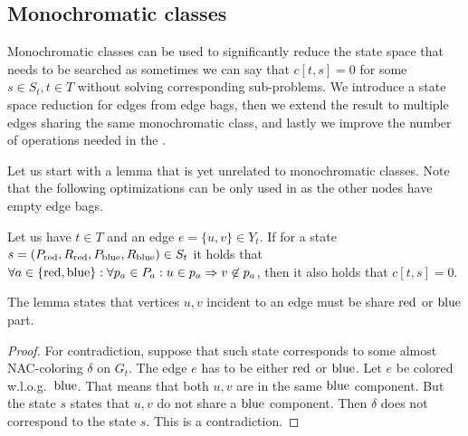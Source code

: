 \subsection{Monochromatic classes}

Monochromatic classes can be used to significantly reduce the state space
that needs to be searched as sometimes we can say that
\( c[t, s] = 0 \) for some \( s \in S_t, t \in T \)
without solving corresponding sub-problems.
%
We introduce a state space reduction for edges from edge bags,
then we extend the result to multiple edges
sharing the same monochromatic class,
and lastly we improve the number of
operations needed in the \IntroduceVertexWithEdgesNode{}.

Let us start with a lemma that is yet unrelated to monochromatic classes.
Note that the following optimizations can be only used in \IntroduceEdgeNode{}
as the other nodes have empty edge bags.
%
\begin{lemma}
	Let us have \( t \in T \) and an edge \( e = \{u, v\} \in Y_t \).
	If for a state \( s = (P_{\text{red}}, R_{\text{red}}, P_{\text{blue}}, R_{\text{blue}}) \in S_t \)
	it holds that
	\( {\forall a \in \{\text{red}, \text{blue}\}} : {\forall p_a \in P_a} : {u \in p_a \Rightarrow v \not\in p_a} \),
	then it also holds that \( c[t, s] = 0 \).
\end{lemma}
%
The lemma states that vertices \( u, v \) incident to an edge must
be share \( \text{red} \) or \( \text{blue} \) part.
%
\begin{proof}
	For contradiction, suppose that such state corresponds
	to some almost NAC-coloring \( \delta \) on \( G_t \).
	The edge \( e \) has to be either \( \text{red} \) or \( \text{blue} \).
	Let \( e \) be colored w.l.o.g.\ \( \text{blue} \).
	That means that both \( u, v \) are in the same \( \text{blue} \) component.
	But the state \( s \) states that \( u, v \) do not share a \( \text{blue} \) component.
	Then \( \delta \) does not correspond to the state \( s \).
	This is a contradiction.
\end{proof}
%

